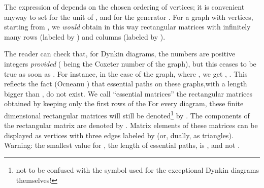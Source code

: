\documentclass[a4paper,11pt]{article}
\begin{document}
The expression of \coordHE{} depends on the chosen ordering of vertices; it is
convenient
anyway to set \coordHE{} for the unit \coordHE{} of \coordHE{}, and
\coordHE{} for the generator
\coordHE{}.
For a graph with \coordHE{} vertices, starting from \coordHE{}, we {\sl
would} obtain in this way \coordHE{} rectangular
matrices \coordHE{} with infinitely many rows (labeled by \coordHE{})
       and \coordHE{} columns (labeled by \coordHE{}).


The reader can check that, for Dynkin \coordHE{} diagrams,
the numbers \coordHE{} are positive integers {\sl
provided} \coordHE{} (\myHighlight{$\kappa$}\coordHE{} being the Coxeter number
of the graph),
but this ceases to be true as soon as \coordHE{}. For instance, in
the case of the \coordHE{} graph,
where \coordHE{}, we get \coordHE{},  \coordHE{}.
This reflects the fact (Ocneanu \cite{Ocneanu:paths}) that essential
paths on these graphs,with a length bigger
than \coordHE{}, do not exist.
We call ``essential matrices''  the \coordHE{} rectangular \coordHE{} matrices
obtained by keeping only the first \coordHE{} rows of the \coordHE{}
For every \coordHE{} diagram, these finite dimensional rectangular
matrices will still be
denoted\footnote{
not to be confused with the symbol used for the exceptional Dynkin diagrams
themselves!} by \coordHE{}.
The components of the rectangular matrix \coordHE{} are denoted by  \coordHE{}.
Matrix elements of these matrices can be displayed as vertices
with three edges labeled by \coordHE{} (or, dually, as triangles).
Warning: the smallest value for \coordHE{}, the length of essential paths,
is \coordHE{}, and not \coordHE{}.
\end{document}
